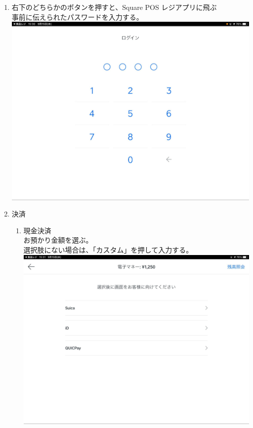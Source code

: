 \documentclass[dvipdfmx,jb5]{jarticle}
\begin{document}
\begin{enumerate}
\begin{enumerate}
   \item 右下のどちらかのボタンを押すと、Square POS レジアプリに飛ぶ\\
   事前に伝えられたパスワードを入力する。\\
   \includegraphics[scale=0.2]{assets/square_password-keypad.jpg}
   \item 決済
    \begin{enumerate}
     \item 現金決済\\
     お預かり金額を選ぶ。\\
     選択肢にない場合は、「カスタム」を押して入力する。\\
     \includegraphics[scale=0.2]{assets/square_e-payment_selection.jpg}\\

\end{enumerate}
\end{enumerate}
\end{enumerate}
\end{document}
